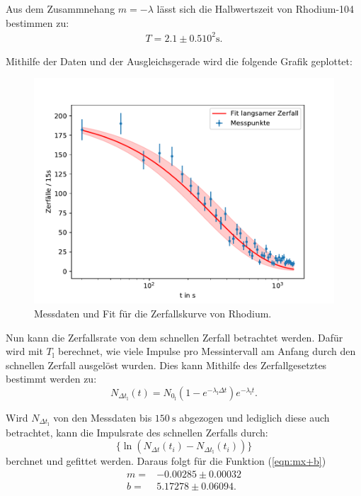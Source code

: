 Aus dem Zusammnehang $m = -\lambda$ lässt sich die Halbwertszeit von Rhodium-104 bestimmen zu:
\begin{align*}
	T = 2.1\pm0.5 10^{2} \si{\second}.
\end{align*}

Mithilfe der Daten und der Ausgleichsgerade wird die folgende Grafik geplottet:
\begin{figure}[H]
	\centering
	\includegraphics{Daten/Rhodium.pdf}
	\caption{Messdaten und Fit für die Zerfallskurve von Rhodium.}
	\label{fig:zerfallskurve}
\end{figure}
\noindent
\newpage
Nun kann die Zerfallsrate von dem schnellen Zerfall betrachtet werden. Dafür wird mit $T_\text{l}$ berechnet, wie viele Impulse pro Messintervall am Anfang durch den schnellen Zerfall ausgelöst wurden.
Dies kann Mithilfe des Zerfallgesetztes bestimmt werden zu:
\begin{equation}
	N_{\Delta t_\text{l}} (t) = N_{0_\text{l}} \left(1 - e^{-\lambda_\text{l}\Delta t}\right) 
	e^{-\lambda_\text{l}t }.
\end{equation}
\noindent

Wird $N_{\Delta t_\text{l}}$ von den Messdaten bis $\SI{150}{\second}$ abgezogen und lediglich diese auch betrachtet, kann die Impulsrate des schnellen Zerfalls durch:
\begin{equation*}
	\{ \ln(N_{\Delta t}(t_i) - N_{\Delta t_\text{l}} (t_i)) \}
\end{equation*}
berchnet und gefittet werden. Daraus folgt für die Funktion (\ref{eqn:mx+b})
\begin{align*}
    m =& -0.00285 \pm 0.00032 \\
    b =& 5.17278 \pm  0.06094.
\end{align*}
\noindent

